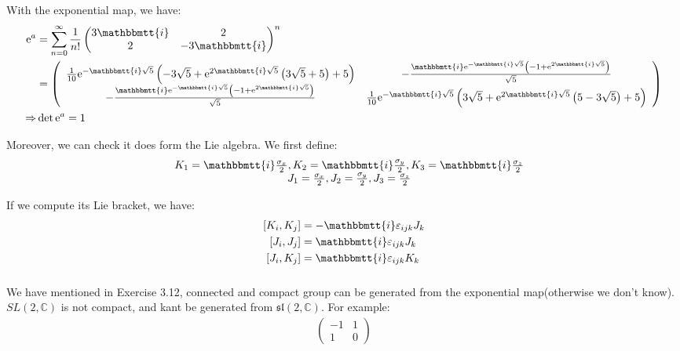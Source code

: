 \documentclass[]{ctexart}
\newcommand{\mi}{\mathbbmtt{i}}
\newcommand{\me}{\mathrm{e}}
\begin{document}
			With the exponential map, we have:
				\begin{equation*}
				\begin{aligned}
					\me ^a&=\sum_{n=0}^{\infty}\frac{1}{n!}
					\begin{pmatrix}
					3\mi & 2\\
					2 & -3\mi 
					\end{pmatrix}^n\\
					&=
					\left(
					\begin{array}{cc}
					\frac{1}{10} \me^{-\mi \sqrt{5}} \left(-3 \sqrt{5}+\me^{2 \mi \sqrt{5}} \left(3 \sqrt{5}+5\right)+5\right) & -\frac{\mi \me^{-\mi \sqrt{5}} \left(-1+\me^{2 \mi \sqrt{5}}\right)}{\sqrt{5}} \\
					-\frac{\mi \me^{-\mi \sqrt{5}} \left(-1+\me^{2 \mi \sqrt{5}}\right)}{\sqrt{5}} & \frac{1}{10} \me^{-\mi \sqrt{5}} \left(3 \sqrt{5}+\me^{2 \mi \sqrt{5}} \left(5-3 \sqrt{5}\right)+5\right) \\
					\end{array}
					\right)\\
					\Rightarrow &\det \me ^a=1
				\end{aligned}
				\end{equation*}
			
			Moreover, we can check it does form the Lie algebra. We first define:
				\begin{equation*}
				\begin{array}{cc}
					&K_1=\mi \frac{\sigma_x}{2},K_2=\mi \frac{\sigma_y}{2},K_3=\mi \frac{\sigma_z}{2}\\
					&J_1=\frac{\sigma_x}{2},J_2= \frac{\sigma_y}{2},J_3= \frac{\sigma_z}{2}
				\end{array}
				\end{equation*}
				
			If we compute its Lie bracket, we have:
				\begin{equation*}
				\begin{aligned}
					\left[K_i,K_j\right]&=-\mi \varepsilon_{ijk}J_k\\
					\left[J_i,J_j\right]&=\mi \varepsilon_{ijk}J_k\\
					\left[J_i,K_j\right]&=\mi \varepsilon_{ijk}K_k
				\end{aligned}
				\end{equation*}
			
		\subsubsection{}
			We have mentioned in Exercise 3.12, connected and compact group can be generated from the exponential map(otherwise we don't know). $SL(2,\mathbb{C})$ is not compact, and kant be generated from $\mathfrak{sl}(2,\mathbb{C})$. For example:
				\begin{equation*}
				\begin{aligned}
					\begin{pmatrix}
					-1 & 1\\
					1 & 0
					\end{pmatrix}
				\end{aligned}
				\end{equation*}
			
\end{document}
